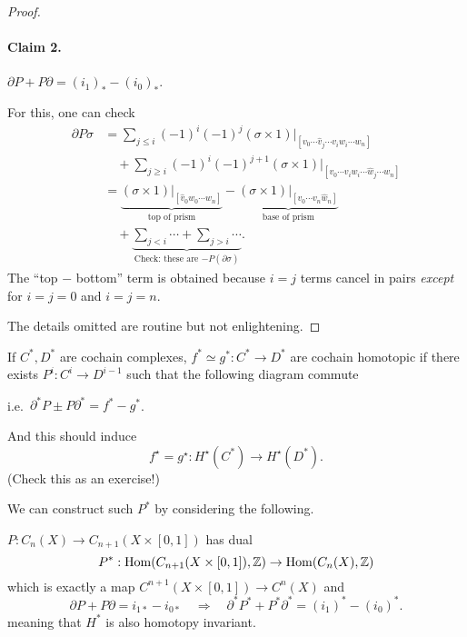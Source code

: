 \documentclass[a4paper,11pt]{article}
\begin{document}
\begin{proof}
		\paragraph{Claim 2.} $\partial P + P \partial = (i_1)_* - (i_0)_*$.

		For this, one can check
		\begin{align*}
			\partial P \sigma & = \sum _{j \leq i} (-1)^i (-1)^j (\sigma \times 1)\big|_{[v_0 \cdots \hat{v}_j \cdots v_i w_i \cdots w_n]}\\
			& \quad + \sum _{j \geq i} (-1)^i (-1)^{j+1} (\sigma \times 1)\big|_{[v_0 \cdots v_i w_i \cdots \hat{w}_j \cdots w_n]}\\
			& = \underbrace{(\sigma \times 1)\big|_{[\hat{v}_0 w_0 \cdots w_n]}}_{\text{top of prism}} - \underbrace{(\sigma \times 1)\big|_{[v_0 \cdots v_n \hat{w}_n]}}_{\text{base of prism}}\\
			& \quad +\underbrace{\sum _{j<i}\cdots + \sum _{j>i}\cdots}_{\text{Check: these are $-P(\partial \sigma)$}}.
		\end{align*}
		The ``top $-$ bottom'' term is obtained because $i = j$ terms cancel in pairs \emph{except} for $i=j=0$ and $i=j=n$.

		The details omitted are routine but not enlightening.
	\end{proof}

	\begin{rmk}
		If $C^*, D^*$ are cochain complexes, $f^* \simeq g^*: C^* \to D^*$ are cochain homotopic if there exists $P^i : C^i \to D ^{i-1}$ such that the following diagram commute
		\begin{center}
		\end{center}
		i.e.\ $\partial^* P \pm P \partial^* = f^* - g^*$.
		
		And this should induce 
		\[
			f^\star = g^\star : H^\star(C^*) \to H^\star (D^*).
		\]
		(Check this as an exercise!)

		We can construct such $P^*$ by considering the following.

		$P: C_n(X) \to C _{n+1}(X\times [0,1])$ has dual
		\[
			P^* : \operatorname{Hom}(C _{n+1}(X\times [0,1]), \mathbb{Z}) \to \operatorname{Hom}(C_n(X),\mathbb{Z})
		\]
		which is exactly a map $C ^{n+1}(X\times [0,1])\to C^n(X)$ and 
		\[
			\partial P + P \partial = i _{1*} - i _{0*} \quad \Rightarrow \quad \partial^* P^* + P^* \partial^* = (i_1)^* - (i_0)^*.
		\]
		meaning that $H^*$ is also homotopy invariant.
	\end{rmk}
\end{document}

